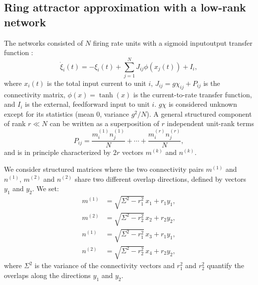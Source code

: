 \documentclass{article} %
\newcounter{ct}
\theoremstyle{definition}
\theoremstyle{remark}
\begin{document}

%


\subsection{Ring attractor approximation with a low-rank network}\label{sec:supp:lowrank}
The networks consisted of \(N\) firing rate units with a sigmoid inputoutput transfer function \citep{mastrogiuseppe2018}:
\begin{equation}
\dot \xi_i(t) = - \xi_i(t) + \sum_{j=1}^{N} J_{ij}\phi(x_j(t)) + I_i,
\label{eq:1}
\end{equation}
where \(x_i(t)\) is the total input current to unit \(i\),
\( J_{ij} = g\chi_{ij} + P_{ij}\) is the connectivity matrix,
\(\phi(x) = \tanh(x)\) is the current-to-rate transfer function, and \(I_i\) is the external, feedforward input to unit \(i\).
\(g\chi\) is considered unknown except for its statistics (mean 0, variance \(g^2/N\)).
A general structured component of rank \(r\ll N\) can be written as a superposition of \(r\) independent unit-rank terms
\begin{equation}
P_{ij} = \frac{m^{(1)}_i n^{(1)}_j}{N} + \cdots + \frac{m^{(r)}_i n^{(r)}_j}{N},
\end{equation} and is in principle characterized by \(2r\) vectors \(m^{(k)}\) and \(n^{(k)}\).


We consider structured matrices where the two connectivity pairs \( m^{(1)} \) and \( n^{(1)} \), \( m^{(2)} \) and \( n^{(2)} \) share two different overlap directions, defined by vectors \( y_1 \) and \( y_2 \). We set:
\begin{align}
    m^{(1)} &= \sqrt{\Sigma^2 - r_1^2} \, x_1 + r_1 y_1, \\
    m^{(2)} &= \sqrt{\Sigma^2 - r_2^2} \, x_2 + r_2 y_2, \\
    n^{(1)} &= \sqrt{\Sigma^2 - r_1^2} \, x_3 + r_1 y_1, \\
    n^{(2)} &= \sqrt{\Sigma^2 - r_2^2} \, x_4 + r_2 y_2,
\end{align}
where \( \Sigma^2 \) is the variance of the connectivity vectors and \( r_1^2 \) and \( r_2^2 \) quantify the overlaps along the directions \( y_1 \) and \( y_2 \).
\end{document}
